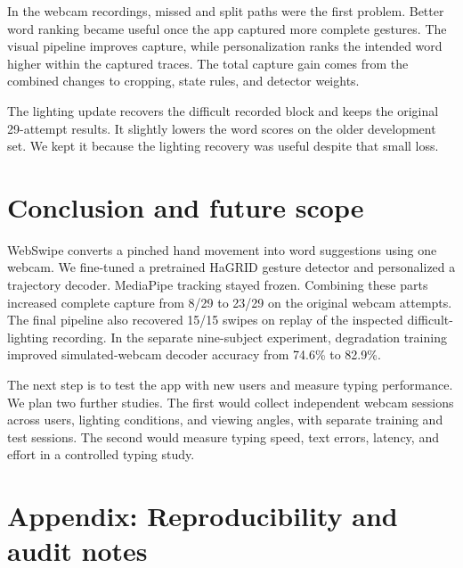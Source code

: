 \documentclass[preprint,12pt]{elsarticle}
\begin{document}
In the webcam recordings, missed and split paths were the first problem. Better word ranking became useful once the app captured more complete gestures. The visual pipeline improves capture, while personalization ranks the intended word higher within the captured traces. The total capture gain comes from the combined changes to cropping, state rules, and detector weights.

The lighting update recovers the difficult recorded block and keeps the original 29-attempt results. It slightly lowers the word scores on the older development set. We kept it because the lighting recovery was useful despite that small loss.



\section{Conclusion and future scope}
WebSwipe converts a pinched hand movement into word suggestions using one webcam. We fine-tuned a pretrained HaGRID gesture detector and personalized a trajectory decoder. MediaPipe tracking stayed frozen. Combining these parts increased complete capture from 8/29 to 23/29 on the original webcam attempts. The final pipeline also recovered 15/15 swipes on replay of the inspected difficult-lighting recording. In the separate nine-subject experiment, degradation training improved simulated-webcam decoder accuracy from 74.6\% to 82.9\%.

The next step is to test the app with new users and measure typing performance. We plan two further studies. The first would collect independent webcam sessions across users, lighting conditions, and viewing angles, with separate training and test sessions. The second would measure typing speed, text errors, latency, and effort in a controlled typing study.


\clearpage
{}
\section*{Appendix: Reproducibility and audit notes}\label{app:reproducibility}
\newcommand{\suppsection}{\subsection*}

\end{document}
